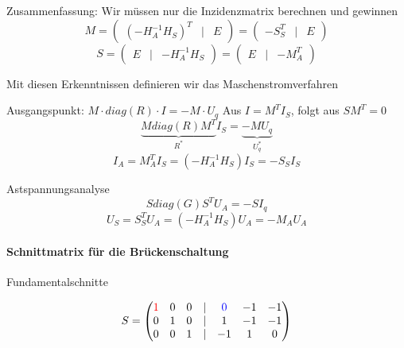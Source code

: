 \documentclass[german]{article}
\begin{document}
Zusammenfassung: Wir müssen nur die Inzidenzmatrix berechnen und gewinnen
\[
	M = \begin{pmatrix} ( -H_A^{-1} H_S )^T & | & E \end{pmatrix} = \begin{pmatrix} - S_S^T & | & E \end{pmatrix}
\]
\[
	S = \begin{pmatrix} E & | & -H_A^{-1} H_S \end{pmatrix} = \begin{pmatrix} E & | & - M_A^T \end{pmatrix}
\]

Mit diesen Erkenntnissen definieren wir das Maschenstromverfahren

Ausgangspunkt: $M \cdot diag(R) \cdot I = -M \cdot U_q$ Aus $I = M^T I_S$, folgt aus $S M^T = 0$
\[
	\underbrace{M diag(R) M^T}_{R^*} I_S = \underbrace{-M U_q}_{U_q^*}
\]
\[
	I_A = M_A^T I_S = ( -H_A^{-1} H_S ) I_S = - S_S I_S
\]

Astspannungsanalyse
\[
	S diag(G) S^T U_A = -S I_q
\]
\[
	U_S = S_S^T U_A = ( -H_A^{-1} H_S ) U_A = - M_A U_A
\]

\paragraph{Schnittmatrix für die Brückenschaltung}

Fundamentalschnitte

\[
	S =
	\begin{pmatrix}
		{\color{red} 1} & 0 & 0 & | & {\color{blue} 0} & -1 & -1 \\
		0 & 1 & 0 & | & 1 & -1 & -1 \\
		0 & 0 & 1 & | & -1 & 1 & 0
	\end{pmatrix}
\]
\end{document}

